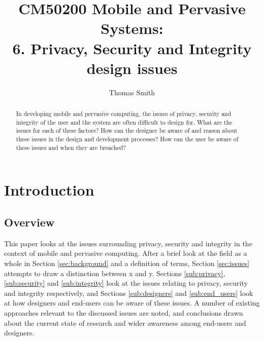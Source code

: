 \documentclass[oribibl,11pt]{llncs}
\begin{document}
\title{CM50200 Mobile and Pervasive Systems:\\6. Privacy, Security and Integrity design issues}


\author{Thomas Smith}
\maketitle

\begin{abstract}
In developing mobile and pervasive computing, the issues of privacy, security and integrity of the user and the system are often difficult to design for. What are the issues for each of these factors? How can the designer be aware of and reason about these issues in the design and development processes? How can the user be aware of these issues and when they are breached?
\end{abstract}

\section{Introduction}


\subsection{Overview}
This paper looks at the issues surrounding privacy, security and integrity in the context of mobile and pervasive computing. After a brief look at the field as a whole in Section \ref{sec:background} and a definition of terms, Section \ref{sec:issues} attempts to draw a distinction between x and y. Sections \ref{sub:privacy}, \ref{sub:security} and \ref{sub:integrity} look at the issues relating to privacy, security and integrity respectively, and Sections \ref{sub:designers} and \ref{sub:end_users} look at how designers and end-users can be aware of these issues. A number of existing approaches relevant to the discussed issues are noted, and conclusions drawn about the current state of research and wider awareness among end-users and designers.
\end{document}
